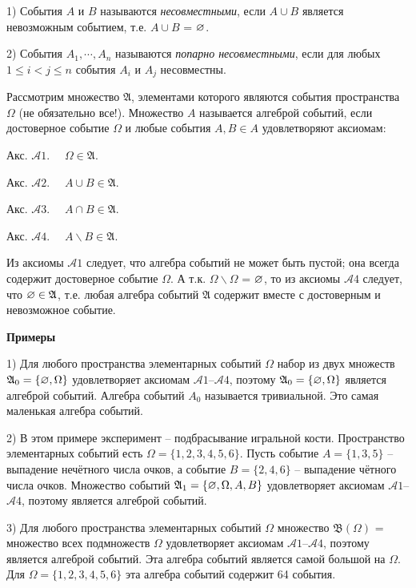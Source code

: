 \begin{definition}
	\label{def:2.7}
1) События $A$ и $B$ называются \textit{несовместными}, если
$A\cup B$ является невозможным событием, т.е. $A\cup B$ = $\varnothing$.

2) События $A_1,\cdots,A_n$ называются \textit{попарно несовместными}, если для любых $1\leq i<j\leq n$ события $A_i$ и $A_j$ несовместны.
\end{definition}

\begin{definition}
	\label{def:2.8}
Рассмотрим множество $\mathfrak{A}$, элементами которого являются события пространства $\Omega$ (не обязательно все!). Множество $A$ называется алгеброй событий, если достоверное событие $\Omega$ и любые события $A, B \in A$
удовлетворяют аксиомам:

Акс. $\mathcal{A}1$.$\quad$ $\Omega\in\mathfrak{A}$.

Акс. $\mathcal{A}2$.$\quad$ $A\cup B\in\mathfrak{A}$.

Акс. $\mathcal{A}3$.$\quad$ $A\cap B\in\mathfrak{A}$.

Акс. $\mathcal{A}4$.$\quad$ $A\backslash B\in\mathfrak{A}$.


Из аксиомы $\mathcal{A}1$ следует, что алгебра событий не может быть пустой; она всегда содержит достоверное событие $\Omega$. А т.к. $\Omega \backslash \Omega$ = $\varnothing$, то из аксиомы $\mathcal{A}4$ следует, что $\varnothing\in\mathfrak{A}$, т.е. любая алгебра событий $\mathfrak{A}$ содержит вместе с достоверным и невозможное событие.
\end{definition}

\textbf{Примеры}

1) Для любого пространства элементарных событий $\Omega$ набор из двух множеств $\mathfrak{A}_0=\{\varnothing,\Omega\}$ удовлетворяет аксиомам $\mathcal{A}1$--$\mathcal{A}4$, поэтому $\mathfrak{A}_0=\{\varnothing,\Omega\}$ является алгеброй событий. Алгебра событий $A_0$ называется тривиальной. Это самая маленькая алгебра событий.

2) В этом примере эксперимент -- подбрасывание игральной кости. 
Пространство элементарных событий есть $\Omega = \{1, 2, 3, 4, 5, 6\}$. 
Пусть событие $A = \{1, 3, 5\}$ -- выпадение нечётного числа очков, а событие $B= \{2, 4, 6\}$ -- выпадение чётного числа очков. 
Множество событий $\mathfrak{A}_1 = \{\varnothing, \Omega, A, B\}$ удовлетворяет аксиомам $\mathcal{A}1$--$\mathcal{A}4$, поэтому является алгеброй событий.

3) Для любого пространства элементарных событий $\Omega$ множество $\mathfrak{B}(\Omega)$ = множество всех подмножеств $\Omega$ удовлетворяет аксиомам $\mathcal{A}1$--$\mathcal{A}4$, поэтому является алгеброй событий. 
Эта алгебра событий является самой большой на $\Omega$. Для $\Omega= \{1, 2, 3, 4, 5, 6\}$ эта алгебра событий содержит 64 события.

